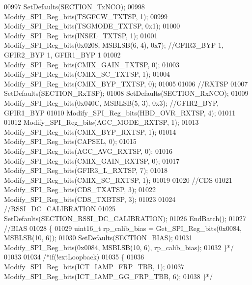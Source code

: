 \begin{DoxyCode}
{{{{{{{{{{{{{{{{{{{{00997 \textcolor{comment}{    SetDefaults(SECTION\_TxNCO);}
00998 \textcolor{comment}{    Modify\_SPI\_Reg\_bits(TSGFCW\_TXTSP, 1);}
00999 \textcolor{comment}{    Modify\_SPI\_Reg\_bits(TSGMODE\_TXTSP, 0x1);}
01000 \textcolor{comment}{    Modify\_SPI\_Reg\_bits(INSEL\_TXTSP, 1);}
01001 \textcolor{comment}{    Modify\_SPI\_Reg\_bits(0x0208, MSBLSB(6, 4), 0x7); //GFIR3\_BYP 1, GFIR2\_BYP 1, GFIR1\_BYP 1}
01002 \textcolor{comment}{    Modify\_SPI\_Reg\_bits(CMIX\_GAIN\_TXTSP, 0);}
01003 \textcolor{comment}{    Modify\_SPI\_Reg\_bits(CMIX\_SC\_TXTSP, 1);}
01004 \textcolor{comment}{    Modify\_SPI\_Reg\_bits(CMIX\_BYP\_TXTSP, 0);}
01005 \textcolor{comment}{}
01006 \textcolor{comment}{    //RXTSP}
01007 \textcolor{comment}{    SetDefaults(SECTION\_RxTSP);}
01008 \textcolor{comment}{    SetDefaults(SECTION\_RxNCO);}
01009 \textcolor{comment}{    Modify\_SPI\_Reg\_bits(0x040C, MSBLSB(5, 3), 0x3); //GFIR2\_BYP, GFIR1\_BYP}
01010 \textcolor{comment}{    Modify\_SPI\_Reg\_bits(HBD\_OVR\_RXTSP, 4);}
01011 \textcolor{comment}{}
01012 \textcolor{comment}{    Modify\_SPI\_Reg\_bits(AGC\_MODE\_RXTSP, 1);}
01013 \textcolor{comment}{    Modify\_SPI\_Reg\_bits(CMIX\_BYP\_RXTSP, 1);}
01014 \textcolor{comment}{    Modify\_SPI\_Reg\_bits(CAPSEL, 0);}
01015 \textcolor{comment}{    Modify\_SPI\_Reg\_bits(AGC\_AVG\_RXTSP, 0);}
01016 \textcolor{comment}{    Modify\_SPI\_Reg\_bits(CMIX\_GAIN\_RXTSP, 0);}
01017 \textcolor{comment}{    Modify\_SPI\_Reg\_bits(GFIR3\_L\_RXTSP, 7);}
01018 \textcolor{comment}{    Modify\_SPI\_Reg\_bits(CMIX\_SC\_RXTSP, 1);}
01019 \textcolor{comment}{}
01020 \textcolor{comment}{    //CDS}
01021 \textcolor{comment}{    Modify\_SPI\_Reg\_bits(CDS\_TXATSP, 3);}
01022 \textcolor{comment}{    Modify\_SPI\_Reg\_bits(CDS\_TXBTSP, 3);}
01023 \textcolor{comment}{}
01024 \textcolor{comment}{    //RSSI\_DC\_CALIBRATION}
01025 \textcolor{comment}{    SetDefaults(SECTION\_RSSI\_DC\_CALIBRATION);}
01026 \textcolor{comment}{    EndBatch();}
01027 \textcolor{comment}{    //BIAS}
01028 \textcolor{comment}{    \{}
01029 \textcolor{comment}{        uint16\_t rp\_calib\_bias = Get\_SPI\_Reg\_bits(0x0084, MSBLSB(10, 6));}
01030 \textcolor{comment}{        SetDefaults(SECTION\_BIAS);}
01031 \textcolor{comment}{        Modify\_SPI\_Reg\_bits(0x0084, MSBLSB(10, 6), rp\_calib\_bias);}
01032 \textcolor{comment}{    \}*/}
01033 
01034     \textcolor{comment}{/*if(!extLoopback)}
01035 \textcolor{comment}{    \{}
01036 \textcolor{comment}{        Modify\_SPI\_Reg\_bits(ICT\_IAMP\_FRP\_TBB, 1);}
01037 \textcolor{comment}{        Modify\_SPI\_Reg\_bits(ICT\_IAMP\_GG\_FRP\_TBB, 6);}
01038 \textcolor{comment}{    \}*/}
}}}}}}}}}}}}}}}}}}}}
\end{DoxyCode}

